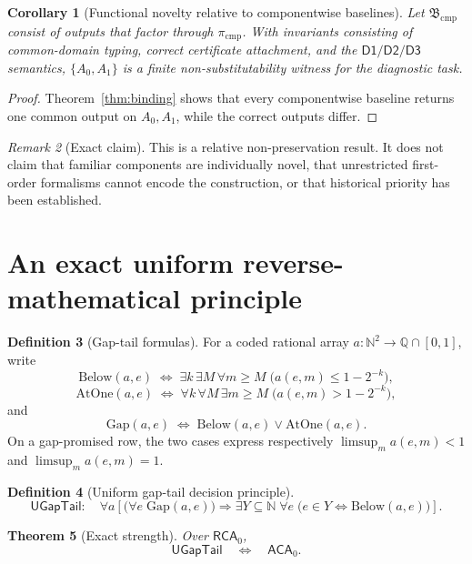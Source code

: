 \documentclass[11pt]{article}
\newcommand{\DOne}{\ensuremath{\mathsf{D1}}}
\newcommand{\DTwo}{\ensuremath{\mathsf{D2}}}
\newcommand{\DThree}{\ensuremath{\mathsf{D3}}}
\newcommand{\RCA}{\ensuremath{\mathsf{RCA}_0}}
\newcommand{\ACA}{\ensuremath{\mathsf{ACA}_0}}
\newcommand{\UGapTail}{\ensuremath{\mathsf{UGapTail}}}
\newcommand{\Base}{\ensuremath{\mathfrak B}}
\theoremstyle{plain}
\newtheorem{theorem}{Theorem}[section]
\newtheorem{corollary}[theorem]{Corollary}
\theoremstyle{definition}
\newtheorem{definition}[theorem]{Definition}
\theoremstyle{remark}
\newtheorem{remark}[theorem]{Remark}
\begin{document}
\begin{corollary}[Functional novelty relative to componentwise baselines]
Let $\Base_{\mathrm{cmp}}$ consist of outputs that factor through
$\pi_{\mathrm{cmp}}$.  With invariants consisting of common-domain typing,
correct certificate attachment, and the $\DOne/\DTwo/\DThree$ semantics,
$\{A_0,A_1\}$ is a finite non-substitutability witness for the diagnostic task.
\end{corollary}

\begin{proof}
Theorem~\ref{thm:binding} shows that every componentwise baseline returns one
common output on $A_0,A_1$, while the correct outputs differ.
\end{proof}

\begin{remark}[Exact claim]
This is a relative non-preservation result.  It does not claim that familiar
components are individually novel, that unrestricted first-order formalisms
cannot encode the construction, or that historical priority has been established.
\end{remark}

\section{An exact uniform reverse-mathematical principle}
\label{sec:reverse}

\begin{definition}[Gap-tail formulas]
For a coded rational array $a:\mathbb N^2\to\mathbb Q\cap[0,1]$, write
\[
\mathrm{Below}(a,e)\;\Longleftrightarrow\;
\exists k\,\exists M\,\forall m\geq M\;
\bigl(a(e,m)\leq1-2^{-k}\bigr),
\]
\[
\mathrm{AtOne}(a,e)\;\Longleftrightarrow\;
\forall k\,\forall M\,\exists m\geq M\;
\bigl(a(e,m)>1-2^{-k}\bigr),
\]
and
\[
\mathrm{Gap}(a,e)\;\Longleftrightarrow\;
\mathrm{Below}(a,e)\vee\mathrm{AtOne}(a,e).
\]
On a gap-promised row, the two cases express respectively
$\limsup_m a(e,m)<1$ and $\limsup_m a(e,m)=1$.
\end{definition}

\begin{definition}[Uniform gap-tail decision principle]
\[
\UGapTail:\quad
\forall a\left[
\bigl(\forall e\;\mathrm{Gap}(a,e)\bigr)
\Longrightarrow
\exists Y\subseteq\mathbb N\;\forall e\;
\bigl(e\in Y\Longleftrightarrow\mathrm{Below}(a,e)\bigr)
\right].
\]
\end{definition}

\begin{theorem}[Exact strength]
\label{thm:ugap}
Over $\RCA$,
\[
\UGapTail\quad\Longleftrightarrow\quad\ACA.
\]
\end{theorem}
\end{document}
